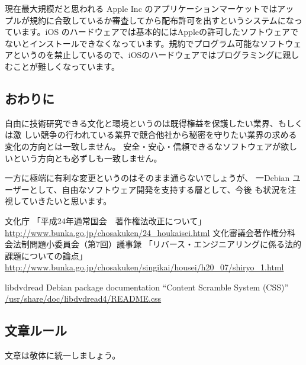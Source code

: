 \documentclass[mingoth,a4paper]{jsarticle}
\begin{document}
現在最大規模だと思われる Apple Inc のアプリケーションマーケットではアッ
プルが規約に合致しているか審査してから配布許可を出すというシステムになっ
ています。iOS のハードウェアでは基本的にはAppleの許可したソフトウェアで
ないとインストールできなくなっています。規約でプログラム可能なソフトウェ
アというのを禁止しているので、iOSのハードウェアではプログラミングに親し
むことが難しくなっています。

\subsection{おわりに}

自由に技術研究できる文化と環境というのは既得権益を保護したい業界、もしくは激
しい競争の行われている業界で競合他社から秘密を守りたい業界の求める
変化の方向とは一致しません。
安全・安心・信頼できるなソフトウェアが欲しいという方向とも必ずしも一致しません。

一方に極端に有利な変更というのはそのまま通らないでしょうが、
一Debian ユーザーとして、自由なソフトウェア開発を支持する層として、今後
も状況を注視していきたいと思います。


\begin{thebibliography}{99}
	 文化庁 「平成24年通常国会　著作権法改正について」
	 \url{http://www.bunka.go.jp/chosakuken/24_houkaisei.html}
	 文化審議会著作権分科会法制問題小委員会（第7回）議事録
	 「リバース・エンジニアリングに係る法的課題についての論点」
 \url{http://www.bunka.go.jp/chosakuken/singikai/housei/h20_07/shiryo_1.html}

	 libdvdread Debian package documentation
	 ``Content Scramble System (CSS)''
	 \url{/usr/share/doc/libdvdread4/README.css}

\end{thebibliography}


\label{sec:debmtg2012howtoprepare}

\subsection{文章ルール}

文章は敬体に統一しましょう。
\end{document}
